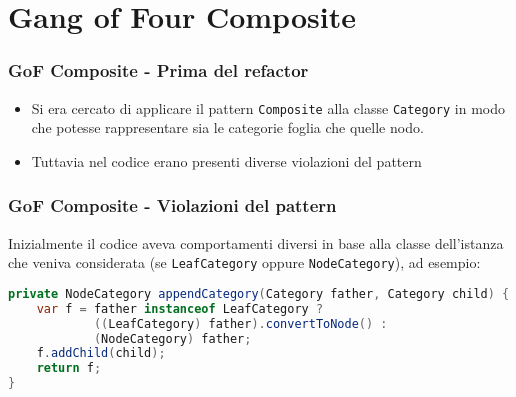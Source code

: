 \section{Gang of Four Composite}
\begin{frame}
    \frametitle{GoF Composite - Prima del refactor}

    \begin{minipage}{.5\textwidth}
        \begin{figure}
            \centering
        \end{figure}
    \end{minipage}
    \begin{minipage}{.49\textwidth}
        \begin{itemize}
            \item<1-> Si era cercato di applicare il pattern \texttt{Composite} alla classe \texttt{Category} in modo che potesse rappresentare sia le categorie foglia che quelle nodo.
            \item<2-> Tuttavia nel codice erano presenti diverse violazioni del pattern
        \end{itemize}
    \end{minipage}

\end{frame}

\begin{frame}[fragile]
    \frametitle{GoF Composite - Violazioni del pattern}

    Inizialmente il codice aveva comportamenti diversi in base alla classe dell'istanza che veniva considerata (se \texttt{LeafCategory} oppure \texttt{NodeCategory}), ad esempio:

    \lstset{style=java}
    \begin{lstlisting}[language=java, caption={v5 commit 34c1a67}]
private NodeCategory appendCategory(Category father, Category child) {
    var f = father instanceof LeafCategory ?
            ((LeafCategory) father).convertToNode() : 
            (NodeCategory) father;
    f.addChild(child);
    return f;
}
    \end{lstlisting}

\end{frame}

